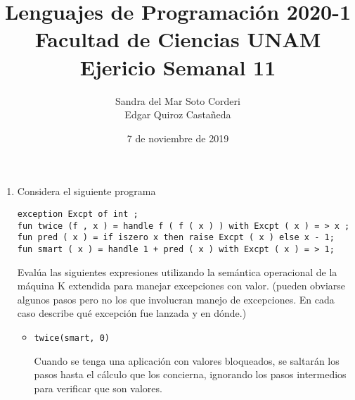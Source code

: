 \documentclass{article}
\title{
    Lenguajes de Programación 2020-1\\
    Facultad de Ciencias UNAM\\
    Ejericio Semanal 11
}
\author{
    Sandra del Mar Soto Corderi\\
    Edgar Quiroz Castañeda
}
\date{
    7 de noviembre de 2019
}
\newcommand{\tx}[1]{\texttt{#1}}
\begin{document}
    \maketitle
	\begin{enumerate}
		\item {
		Considera el siguiente programa

		\tx{exception Excpt of int ;}\\
		\tx{fun twice (f , x ) = handle f ( f ( x ) ) with Excpt ( x ) = > x ;}\\
		\tx{fun pred ( x ) = if iszero x then raise Excpt ( x ) else x - 1;}\\
		\tx{fun smart ( x ) = handle 1 + pred ( x ) with Excpt ( x ) = > 1;}
		
		Evalúa las siguientes expresiones utilizando la semántica operacional de
		la máquina K extendida para manejar excepciones con valor. (pueden
		obviarse algunos pasos pero no los que involucran manejo de excepciones.
		En cada caso describe qué excepción fue lanzada y en dónde.)

		\begin{itemize}
			\item {
			\tx{twice(smart, 0)}

			Cuando se tenga una aplicación con valores bloqueados, se saltarán 
			los pasos hasta el cálculo que los concierna, ignorando los pasos 
			intermedios para verificar que son valores.

}
\end{itemize}}
\end{enumerate}
\end{document}
